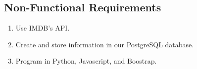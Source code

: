 \documentclass{article}
\begin{document}
\subsection{Non-Functional Requirements}
\begin{enumerate}
    \item Use IMDB's API.
    \item Create and store information in our PostgreSQL database.
    \item Program in Python, Javascript, and Boostrap.
\end{enumerate}
\end{document}
